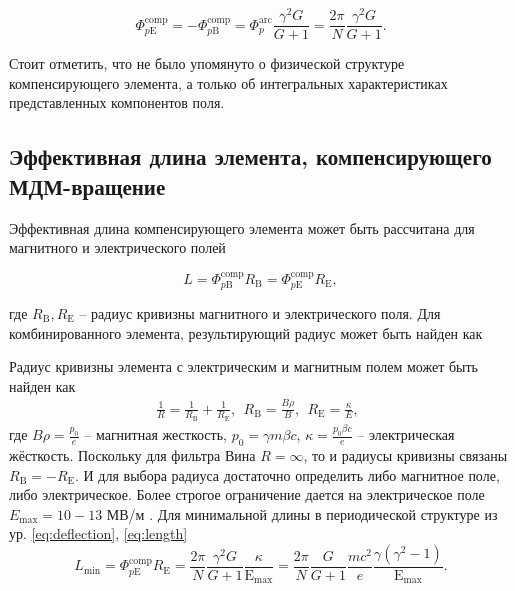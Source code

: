 \begin{equation}
	\Phi_{p\mathrm{E}}^{\textrm{comp}} = - \Phi_{p\mathrm{B}}^{\textrm{comp}} = {\Phi}_{p}^{\text{arc}}\frac{\gamma^2 G}{G+1} =\frac{2\pi}{N}\frac{\gamma^2 G}{G+1}.
	\label{eq:deflection}
\end{equation}

\noindent Стоит отметить, что не было упомянуто о физической структуре компенсирующего элемента, а только об интегральных характеристиках представленных компонентов поля.

	\subsection{Эффективная длина элемента, компенсирующего МДМ-вращение}\label{sec:EDM/requirements/length}
	
\par Эффективная длина компенсирующего элемента может быть рассчитана для магнитного и электрического полей

\begin{equation}
	L = \Phi_{p\mathrm{B}}^{\text{comp}}R_{\mathrm{B}} = \Phi_{p\mathrm{E}}^{\text{comp}}R_{\mathrm{E}},
	\label{eq:length}
\end{equation}

\noindent где $R_{\mathrm{B}}, R_{\mathrm{E}}$ -- радиус кривизны магнитного и электрического поля. Для комбинированного элемента, результирующий радиус может быть найден как
	
\par Радиус кривизны элемента с электрическим и магнитным полем может быть найден как
\begin{equation}
	\begin{gathered}
		\frac{1}{R}  = \frac{1}{R_\textrm{B}}+\frac{1}{R_\textrm{E}}, \ \ 
		R_\textrm{B}  = \frac{B\rho}{B}, \ \ 
		R_\textrm{E}  = \frac{\kappa}{E}, \ \ 
	\end{gathered}
\end{equation}
где $B\rho=\frac{p_0}{e}$ – магнитная жесткость, $p_0=\gamma m\beta c$, $\kappa=\frac{p_0\beta c}{e}$ – электрическая жёсткость.
Поскольку для фильтра Вина $R=\infty$, то и радиусы кривизны связаны $R_{\textrm{B}}=-R_{\textrm{E}}$. И для выбора радиуса достаточно определить либо магнитное поле, либо электрическое. Более строгое ограничение дается на электрическое поле $E_{\textrm{max}}=10-13$ МВ/м \cite{Wien}. Для минимальной длины в периодической структуре из ур. \ref{eq:deflection}, \ref{eq:length} 
\begin{equation}
		L_{\text{min}} = \Phi_{p\mathrm{E}}^{\text{comp}}R_{\mathrm{E}}=
		\frac{2\pi}{N}\frac{\gamma^2 G}{G+1}\frac{\kappa}{\mathrm{E}_{\text{max}}}
		 = \frac{2\pi}{N}\frac{G}{G+1}\frac{mc^2}{e}\frac{\gamma(\gamma^2-1)}{\mathrm{E}_{\text{max}}}.
		\label{eq:length_min}
\end{equation}


